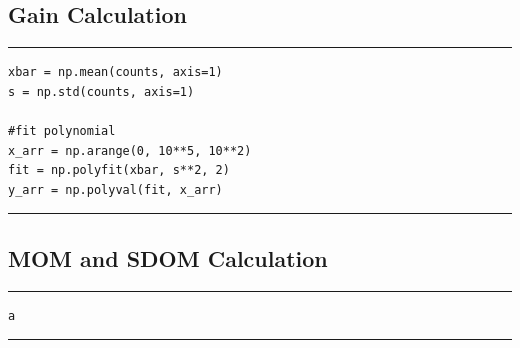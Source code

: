\documentclass[preprint]{aastex62}
\begin{document}
\subsection{Gain Calculation} \label{code:gain} 
\hrule
\begin{lstlisting}
xbar = np.mean(counts, axis=1)
s = np.std(counts, axis=1)

#fit polynomial
x_arr = np.arange(0, 10**5, 10**2)
fit = np.polyfit(xbar, s**2, 2)
y_arr = np.polyval(fit, x_arr)
\end{lstlisting}
\hrule \vspace{7pt}

\subsection{MOM and SDOM Calculation} \label{code:mom_sdom} 
\hrule
\begin{lstlisting}
a
\end{lstlisting}
\hrule \vspace{7pt}

% 

\end{document}
